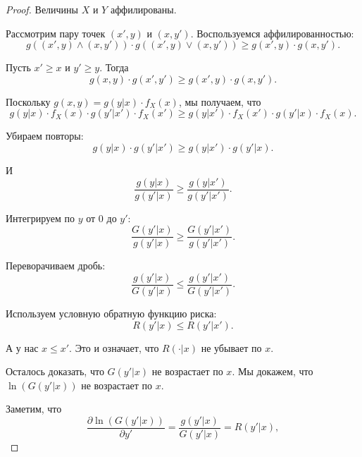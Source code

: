 \begin{proof}
Величины $ X $ и $ Y $ аффилированы.

Рассмотрим пару точек $ (x',y) $ и $ (x,y') $. Воспользуемся аффилированностью:
\begin{equation}
g((x',y)\wedge (x,y'))\cdot g((x',y)\vee (x,y'))\geq g(x',y)\cdot g(x,y').
\end{equation}


Пусть $ x'\geq x $ и $ y'\geq y $. Тогда
\begin{equation}
g(x,y)\cdot g(x',y')\geq g(x',y)\cdot g(x,y').
\end{equation}

Поскольку $ g(x,y)=g(y|x)\cdot f_{X}(x) $, мы получаем, что
\begin{equation}
g(y|x)\cdot f_{X}(x)\cdot g(y'|x')\cdot f_{X}(x')\geq g(y|x')\cdot f_{X}(x')\cdot g(y'|x)\cdot f_{X}(x).
\end{equation}

Убираем повторы:
\begin{equation}
g(y|x)\cdot g(y'|x')\geq g(y|x')\cdot g(y'|x).
\end{equation}

И
\begin{equation}
\frac{g(y|x)}{g(y'|x)}\geq \frac{g(y|x')}{g(y'|x')}.
\end{equation}

Интегрируем по $ y $ от $ 0 $ до $ y' $:
\begin{equation}
\frac{G(y'|x)}{g(y'|x)}\geq \frac{G(y'|x')}{g(y'|x')}.
\end{equation}

Переворачиваем дробь:
\begin{equation}
\frac{g(y'|x)}{G(y'|x)}\leq \frac{g(y'|x')}{G(y'|x')}.
\end{equation}

Используем условную обратную функцию риска:
\begin{equation}
R(y'|x)\leq R(y'|x').
\end{equation}

А у нас $ x\leq x' $. Это и означает, что $ R(\cdot|x) $ не убывает по $ x $.

Осталось доказать, что $ G(y'|x) $ не возрастает по $ x $. Мы докажем, что $ \ln (G(y'|x)) $ не возрастает по $ x $.

Заметим, что
\begin{equation}
\frac{\partial \ln (G(y'|x))}{\partial y'}=\frac{g(y'|x)}{G(y'|x)}=R(y'|x),
\end{equation}


\end{proof}
